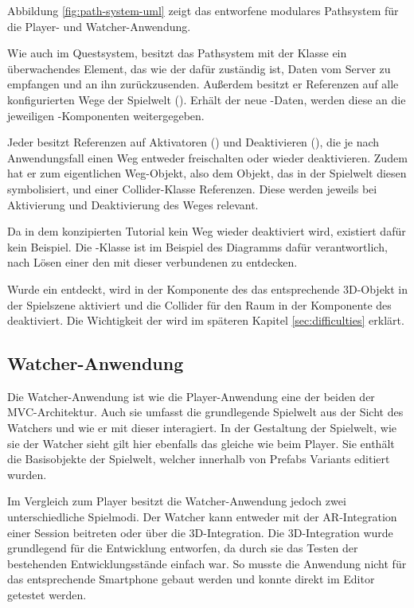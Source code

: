 Abbildung \ref{fig:path-system-uml} zeigt das entworfene modulares Pathsystem für die Player- und Watcher-Anwendung.

Wie auch im Questsystem, besitzt das Pathsystem mit der Klasse  ein überwachendes Element, das wie der  dafür zuständig ist, Daten vom Server zu empfangen und an ihn zurückzusenden. Außerdem besitzt er Referenzen auf alle konfigurierten Wege der Spielwelt (). Erhält der  neue -Daten, werden diese an die jeweiligen -Komponenten weitergegeben.

Jeder  besitzt Referenzen auf Aktivatoren () und Deaktivieren (), die je nach Anwendungsfall einen Weg entweder freischalten oder wieder deaktivieren. Zudem hat er zum eigentlichen Weg-Objekt, also dem Objekt, das in der Spielwelt diesen  symbolisiert, und einer Collider-Klasse Referenzen. Diese werden jeweils bei Aktivierung und Deaktivierung des Weges relevant.

Da in dem konzipierten Tutorial kein Weg wieder deaktiviert wird, existiert dafür kein Beispiel. Die -Klasse ist im Beispiel des Diagramms dafür verantwortlich, nach Lösen einer  den mit dieser  verbundenen  zu entdecken.

Wurde ein  entdeckt, wird in der Komponente des  das entsprechende \ac{3D}-Objekt in der Spielszene aktiviert und die Collider für den Raum in der Komponente des  deaktiviert. Die Wichtigkeit der  wird im späteren Kapitel \ref{sec:difficulties} erklärt. 

\subsection{Watcher-Anwendung}
Die Watcher-Anwendung ist wie die Player-Anwendung eine der beiden  der \ac{MVC}-Architektur. Auch sie umfasst die grundlegende Spielwelt aus der Sicht des Watchers und wie er mit dieser interagiert. In der Gestaltung der Spielwelt, wie sie der Watcher sieht gilt hier ebenfalls das gleiche wie beim Player. Sie enthält die Basisobjekte der Spielwelt, welcher innerhalb von Prefabs Variants editiert wurden.

Im Vergleich zum Player besitzt die Watcher-Anwendung jedoch zwei unterschiedliche Spielmodi. Der Watcher kann entweder mit der \ac{AR}-Integration einer Session beitreten oder über die \ac{3D}-Integration. Die \ac{3D}-Integration wurde grundlegend für die Entwicklung entworfen, da durch sie das Testen der bestehenden Entwicklungsstände einfach war. So musste die Anwendung nicht für das entsprechende Smartphone gebaut werden und konnte direkt im Editor getestet werden.

